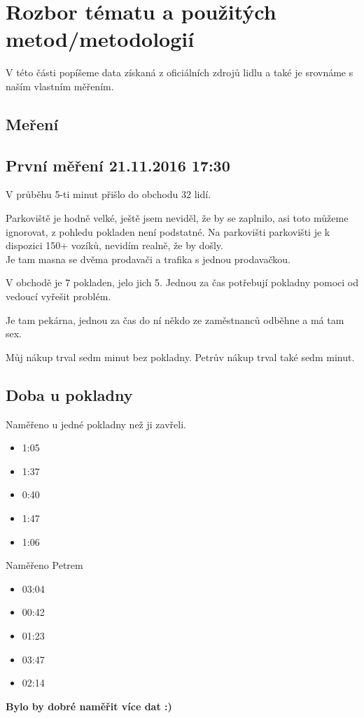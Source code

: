 \documentclass[12pt,a4paper,titlepage]{article}
\begin{document}
\section{Rozbor tématu a použitých metod/metodologií}
V této části popíšeme data získaná z oficiálních zdrojů lidlu a také je srovnáme s naším vlastním měřením.
\subsection{Meření}
\subsection{První měření 21.11.2016 17:30}
V průběhu 5-ti minut přišlo do obchodu 32 lidí.

Parkoviště je hodně velké, ještě jsem neviděl, že by se zaplnilo, asi toto můžeme ignorovat, z pohledu pokladen není podstatné.
Na parkovišti parkovišti je k dispozici 150+ vozíků, nevidím realně, že by došly.
\\
Je tam masna se dvěma prodavači a trafika s jednou prodavačkou.

V obchodě je 7 pokladen, jelo jich 5. Jednou za čas potřebují pokladny pomoci od vedoucí vyřešit problém.

Je tam pekárna, jednou za čas do ní někdo ze zaměstnanců odběhne a má tam sex.

Můj nákup trval sedm minut bez pokladny. Petrův nákup trval také sedm minut.

\subsection{Doba u pokladny}
Naměřeno u jedné pokladny než ji zavřeli.
\begin{itemize}
\item 1:05
\item 1:37
\item 0:40
\item 1:47
\item 1:06
\end{itemize}
Naměřeno Petrem
\begin{itemize}
\item 03:04
\item 00:42
\item 01:23
\item 03:47
\item 02:14
\end{itemize}


\textbf{Bylo by dobré naměřit více dat :) }
\end{document}
